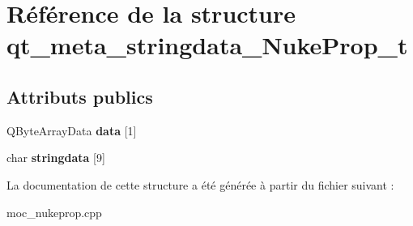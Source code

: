 \hypertarget{structqt__meta__stringdata__NukeProp__t}{\section{Référence de la structure qt\+\_\+meta\+\_\+stringdata\+\_\+\+Nuke\+Prop\+\_\+t}
\label{structqt__meta__stringdata__NukeProp__t}
}
\subsection*{Attributs publics}
\begin{DoxyCompactItemize}
\item 
\hypertarget{structqt__meta__stringdata__NukeProp__t_a7463b0af5b6196095dfe14d28ee16962}{Q\+Byte\+Array\+Data {\bfseries data} \mbox{[}1\mbox{]}}\label{structqt__meta__stringdata__NukeProp__t_a7463b0af5b6196095dfe14d28ee16962}

\item 
\hypertarget{structqt__meta__stringdata__NukeProp__t_ad0d40a1ed0283ba2f74c97bdb03b8d61}{char {\bfseries stringdata} \mbox{[}9\mbox{]}}\label{structqt__meta__stringdata__NukeProp__t_ad0d40a1ed0283ba2f74c97bdb03b8d61}

\end{DoxyCompactItemize}


La documentation de cette structure a été générée à partir du fichier suivant \+:\begin{DoxyCompactItemize}
\item 
moc\+\_\+nukeprop.\+cpp\end{DoxyCompactItemize}
